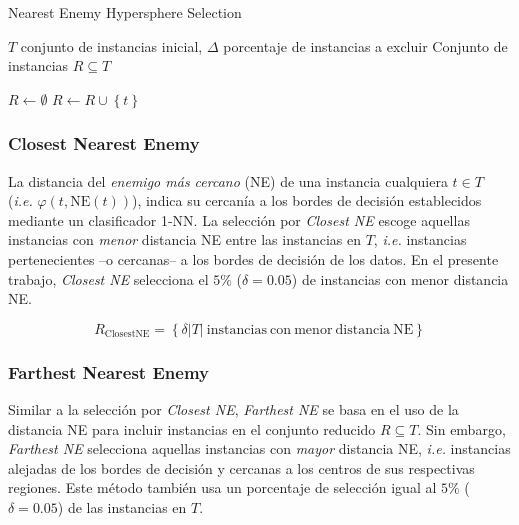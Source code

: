 \begin{algorithm}
\caption{Nearest Enemy Hypersphere Selection}
\label{necs-alg}
\begin{algorithmic}[1]

\Require $T$ conjunto de instancias inicial, $\Delta$ porcentaje de instancias a excluir
\Ensure Conjunto de instancias $R \subseteq T$

\State $R \gets \emptyset$
		\State $R \gets R \cup \left\lbrace t \right\rbrace$
	\EndIf
\EndFor
\State {}
\end{algorithmic}
\end{algorithm}

\subsubsection{Closest Nearest Enemy}

La distancia del \emph{enemigo más cercano} (NE) de una instancia cualquiera $t \in T$ (\emph{i.e.} $\varphi(t,\mathrm{NE}(t))$), indica su cercanía a los bordes de decisión establecidos mediante un clasificador 1-NN. La selección por \emph{Closest NE} escoge aquellas instancias con \emph{menor} distancia NE entre las instancias en $T$, \emph{i.e.} instancias pertenecientes --o cercanas-- a los bordes de decisión de los datos. En el presente trabajo, \emph{Closest NE} selecciona el $5\%$ ($\delta = 0.05$) de instancias con menor distancia NE.

\begin{equation}
R_\mathrm{ClosestNE} = \left\lbrace \delta \vert T \vert\ \mathrm{instancias\ con\ menor\ distancia\ NE} \right\rbrace
\end{equation}

\subsubsection{Farthest Nearest Enemy}

Similar a la selección por \emph{Closest NE}, \emph{Farthest NE} se basa en el uso de la distancia NE para incluir instancias en el conjunto reducido $R \subseteq T$. Sin embargo, \emph{Farthest NE} selecciona aquellas instancias con \emph{mayor} distancia NE, \emph{i.e.} instancias alejadas de los bordes de decisión y cercanas a los centros de sus respectivas regiones. Este método también usa un porcentaje de selección igual al $5\%$ ($\delta = 0.05$) de las instancias en $T$.

